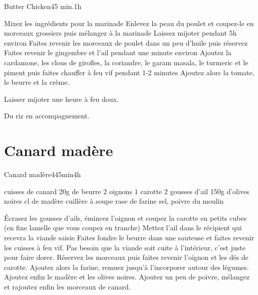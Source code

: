 {\begin{recette}{Butter Chicken}{}{45 min.}{1h}
\begin{preparation}
\etape Mixez les ingrédients pour la marinade
\etape Enlevez la peau du poulet et coupez-le en morceaux grossiers puis mélangez à la marinade
\etape Laissez mijoter pendant 5h environ
\etape Faites revenir les morceaux de poulet dans un peu d'huile puis réservez
\etape Faites revenir le gingembre et l'ail pendant une minute environ
\etape Ajoutez la cardamone, les clous de girofles, la coriandre, le garam masala, le turmeric et le piment puis faites chauffer à feu vif pendant 1-2 minutes
\etape Ajoutez alors la tomate, le beurre et la crème.
\end{preparation}

\begin{cuisson}
Laisser mijoter une heure à feu doux. 

Du riz en accompagnement.
\end{cuisson}
\end{recette}

\section{Canard madère}
\begin{recette}{Canard madère}{4}{45min}{4h}

\begin{ingredients}
 cuisses de canard
\ingredient 20g de beurre
\ingredient $2$ oignons
\ingredient $1$ carotte
\ingredient $2$ gousses d'ail
\ingredient 150g d'olives noires
 cl de madère
 cuillère à soupe rase de farine
\ingredient sel, poivre du moulin
\end{ingredients}

\begin{preparation}
\etape Écrasez les gousses d'ails, émincez l'oignon et coupez la carotte en petits cubes (en fine lamelle que vous coupez en 
tranche)
\etape Mettez l'ail dans le récipient qui recevra la viande saisie
\etape Faites fondre le beurre dans une sauteuse et faites revenir les cuisses à feu vif. Pas besoin que la viande soit cuite à l'intérieur, c'est juste pour faire dorer.
\etape Réservez les morceaux puis faites revenir l'oignon et les dés de carotte.
\etape Ajoutez alors la farine, remuez jusqu'à l'incorporer autour des légumes. Ajoutez enfin le madère et les olives noires. Ajoutez un peu de poivre, mélangez et rajoutez enfin les morceaux de canard.
\end{preparation}


\end{recette}}
